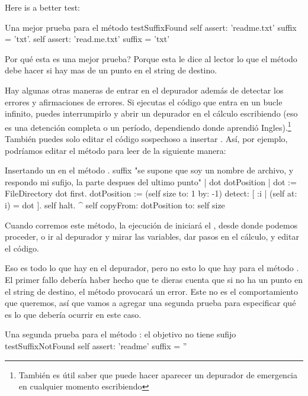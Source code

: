 \documentclass[spanish,a4paper,10pt,twoside]{book}
\begin{document}
Here is a better test:

\begin{method}[testSuffix2]{Una mejor prueba para el m\'etodo }
testSuffixFound
	self assert: 'readme.txt' suffix = 'txt'.
	self assert: 'read.me.txt' suffix = 'txt'
\end{method}
\noindent
Por qu\'e esta es una mejor prueba?  Porque esta le dice al lector lo que el m\'etodo debe hacer si hay mas de un punto en el string de destino.

Hay algunas otras maneras de entrar en el depurador adem\'as de detectar los errores y afirmaciones de errores.
Si ejecutas el c\'odigo que entra en un bucle infinito, puedes interrumpirlo y
abrir un depurador en el c\'alculo escribiendo  (eso es una detenci\'on completa o un per\'iodo, dependiendo donde aprendi\'o Ingles).\footnote{Tambi\'en es \'util saber que puede hacer aparecer un depurador de emergencia en cualquier momento escribiendo } Tambi\'en puedes solo editar el c\'odigo sospechoso a insertar .
As\'i, por ejemplo, podr\'iamos editar el m\'etodo  para leer de la siguiente manera:

\needspace{11ex}
\begin{method}[suffix]{Insertando un  en el m\'etodo .}
suffix
	"se supone que soy un nombre de archivo, y respondo mi sufijo, la parte despues del ultimo punto"
	| dot dotPosition |
	dot := FileDirectory dot first.
	dotPosition := (self size to: 1 by: -1) detect: [ :i | (self at: i) = dot ].
	self halt.
	^ self copyFrom: dotPosition to: self size
\end{method}

Cuando corremos este m\'etodo, la ejecuci\'on de  iniciar\'a el , desde donde podemos proceder, o ir al depurador y mirar las variables, dar pasos en el c\'alculo, y editar el c\'odigo.

Eso es todo lo que hay en el depurador, pero no esto lo que hay para el m\'etodo .
El primer fallo deber\'ia haber hecho que te dieras cuenta que si no ha un punto en el string de destino, el m\'etodo  provocar\'a un error.
Este no es el comportamiento que queremos, as\'i que vamos a agregar una segunda prueba para especificar qu\'e es lo que deber\'ia ocurrir en este caso.

\begin{method}[testNoSuffix]{Una segunda prueba para el m\'etodo : el objetivo no tiene sufijo}
testSuffixNotFound
	self assert: 'readme' suffix = ''
\end{method}
\end{document}
